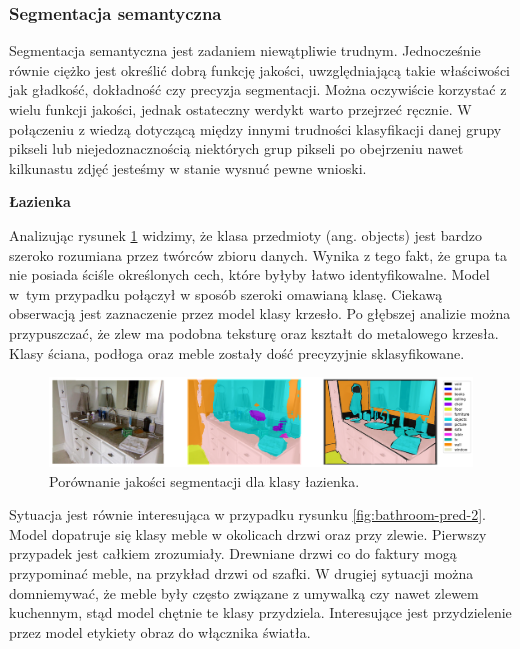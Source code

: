 \subsubsection{Segmentacja semantyczna}
Segmentacja semantyczna jest zadaniem niewątpliwie trudnym. Jednocześnie równie ciężko jest określić dobrą funkcję jakości, uwzględniającą takie właściwości jak gładkość, dokładność czy precyzja segmentacji. Można oczywiście korzystać z wielu funkcji jakości, jednak ostateczny werdykt warto przejrzeć ręcznie. W połączeniu z wiedzą dotyczącą między innymi trudności klasyfikacji danej grupy pikseli lub niejedoznacznością niektórych grup pikseli po obejrzeniu nawet kilkunastu zdjęć jesteśmy w stanie wysnuć pewne wnioski.

\clearpage
\noindent
\textbf{Łazienka}

Analizując rysunek \ref{fig:bathroom-pred-1} widzimy, że klasa przedmioty (ang. objects) jest bardzo szeroko rozumiana przez twórców zbioru danych. Wynika z tego fakt, że grupa ta nie posiada ściśle określonych cech, które byłyby łatwo identyfikowalne. Model w~tym przypadku połączył w sposób szeroki omawianą klasę. Ciekawą obserwacją jest zaznaczenie przez model klasy krzesło. Po głębszej analizie można przypuszczać, że zlew ma podobna teksturę oraz kształt do metalowego krzesła. Klasy ściana, podłoga oraz meble zostały dość precyzyjnie sklasyfikowane.

\begin{figure}[ht!]
    \centering
    \includegraphics[width=\textwidth]{img/preds_analysis/gt_vs_pred/bathroom-1.png}
    \caption{Porównanie jakości segmentacji dla klasy łazienka.}
    \label{fig:bathroom-pred-1}
\end{figure}

Sytuacja jest równie interesująca w przypadku rysunku \ref{fig:bathroom-pred-2}. Model dopatruje się klasy meble w okolicach drzwi oraz przy zlewie. Pierwszy przypadek jest całkiem zrozumiały. Drewniane drzwi co do faktury mogą przypominać meble, na przykład drzwi od szafki. W drugiej sytuacji można domniemywać, że meble były często związane z umywalką czy nawet zlewem kuchennym, stąd model chętnie te klasy przydziela. Interesujące jest przydzielenie przez model etykiety obraz do włącznika światła.

